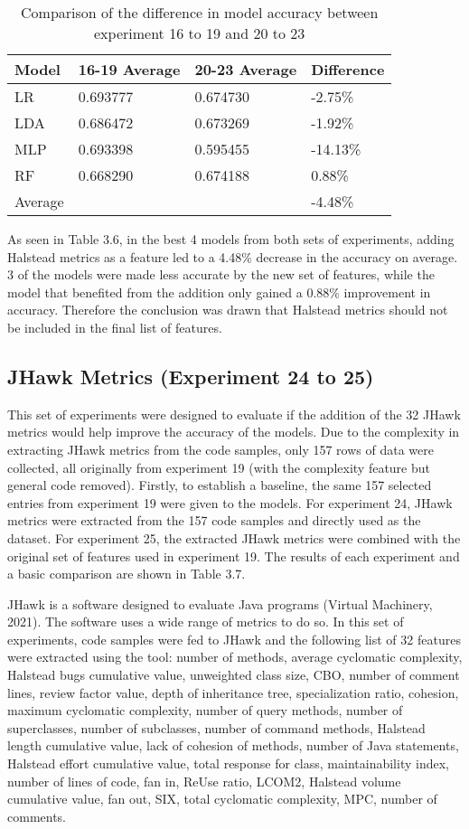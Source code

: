 \documentclass{report}
\begin{document}
\begin{table}[h!]
\centering
\begin{tabular}{l|ll|l}
\hline
Model & 16-19 Average & 20-23 Average & Difference \\
\hline
LR & 0.693777 & 0.674730 & -2.75\% \\
LDA & 0.686472 & 0.673269 & -1.92\% \\
MLP & 0.693398 & 0.595455 & -14.13\% \\
RF & 0.668290 & 0.674188 & 0.88\% \\
\hline
Average &  &  & -4.48\% \\
\hline
\end{tabular}
\caption{Comparison of the difference in model accuracy between experiment 16 to 19 and 20 to 23}
\label{tab:3.6}
\end{table}

As seen in Table 3.6, in the best 4 models from both sets of experiments, adding Halstead metrics as a feature led to a 4.48\% decrease in the accuracy on average. 3 of the models were made less accurate by the new set of features, while the model that benefited from the addition only gained a 0.88\% improvement in accuracy. Therefore the conclusion was drawn that Halstead metrics should not be included in the final list of features.

\subsection{JHawk Metrics (Experiment 24 to 25)}

This set of experiments were designed to evaluate if the addition of the 32 JHawk metrics would help improve the accuracy of the models. Due to the complexity in extracting JHawk metrics from the code samples, only 157 rows of data were collected, all originally from experiment 19 (with the complexity feature but general code removed). Firstly, to establish a baseline, the same 157 selected entries from experiment 19 were given to the models. For experiment 24, JHawk metrics were extracted from the 157 code samples and directly used as the dataset. For experiment 25, the extracted JHawk metrics were combined with the original set of features used in experiment 19. The results of each experiment and a basic comparison are shown in Table 3.7.

JHawk is a software designed to evaluate Java programs (Virtual Machinery, 2021). The software uses a wide range of metrics to do so. In this set of experiments, code samples were fed to JHawk and the following list of 32 features were extracted using the tool: number of methods, average cyclomatic complexity, Halstead bugs cumulative value, unweighted class size, CBO, number of comment lines, review factor value, depth of inheritance tree, specialization ratio, cohesion, maximum cyclomatic complexity, number of query methods, number of superclasses, number of subclasses, number of command methods, Halstead length cumulative value, lack of cohesion of methods, number of Java statements, Halstead effort cumulative value, total response for class, maintainability index, number of lines of code, fan in, ReUse ratio, LCOM2, Halstead volume cumulative value, fan out, SIX, total cyclomatic complexity, MPC, number of comments.
\end{document}
